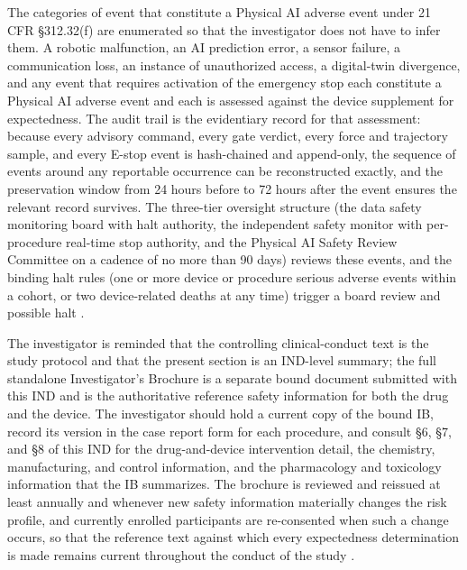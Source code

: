 The categories of event that constitute a Physical AI adverse event under 21 CFR
\S 312.32(f) are enumerated so that the investigator does not have to infer them.
A robotic malfunction, an AI prediction error, a sensor failure, a communication
loss, an instance of unauthorized access, a digital-twin divergence, and any event
that requires activation of the emergency stop each constitute a Physical AI adverse
event and each is assessed against the device supplement for expectedness. The
audit trail is the evidentiary record for that assessment: because every advisory
command, every gate verdict, every force and trajectory sample, and every E-stop
event is hash-chained and append-only, the sequence of events around any reportable
occurrence can be reconstructed exactly, and the preservation window from 24 hours
before to 72 hours after the event ensures the relevant record survives. The
three-tier oversight structure (the data safety monitoring board with halt
authority, the independent safety monitor with per-procedure real-time stop
authority, and the Physical AI Safety Review Committee on a cadence of no more than
90 days) reviews these events, and the binding halt rules (one or more device or
procedure serious adverse events within a cohort, or two device-related deaths at
any time) trigger a board review and possible halt \cite{cfr312paiuni,clintrustpai,paiautospons}.

The investigator is reminded that the controlling clinical-conduct text is the
study protocol and that the present section is an IND-level summary; the full
standalone Investigator's Brochure is a separate bound document submitted with this
IND and is the authoritative reference safety information for both the drug and the
device. The investigator should hold a current copy of the bound IB, record its
version in the case report form for each procedure, and consult \S 6, \S 7, and
\S 8 of this IND for the drug-and-device intervention detail, the chemistry,
manufacturing, and control information, and the pharmacology and toxicology
information that the IB summarizes. The brochure is reviewed and reissued at least
annually and whenever new safety information materially changes the risk profile,
and currently enrolled participants are re-consented when such a change occurs, so
that the reference text against which every expectedness determination is made
remains current throughout the conduct of the study
\cite{phase1guidance,daraxwhipple,oncotrialllm}.
